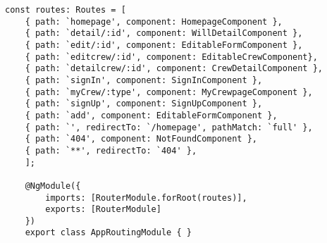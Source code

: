 \begin{lstlisting}[style=Java, caption = {Implementazione del \textit{pattern} \textit{Lazy loading} nel \textit{AppRoutingModule}}]
const routes: Routes = [
    { path: `homepage', component: HomepageComponent },
    { path: `detail/:id', component: WillDetailComponent },
    { path: `edit/:id', component: EditableFormComponent },
    { path: `editcrew/:id', component: EditableCrewComponent},
    { path: `detailcrew/:id', component: CrewDetailComponent },
    { path: `signIn', component: SignInComponent },
    { path: `myCrew/:type', component: MyCrewpageComponent },
    { path: `signUp', component: SignUpComponent },
    { path: `add', component: EditableFormComponent },
    { path: `', redirectTo: `/homepage', pathMatch: `full' },
    { path: `404', component: NotFoundComponent },
    { path: `**', redirectTo: `404' },
    ];
    
    @NgModule({
        imports: [RouterModule.forRoot(routes)],
        exports: [RouterModule]
    })
    export class AppRoutingModule { }  
\end{lstlisting}